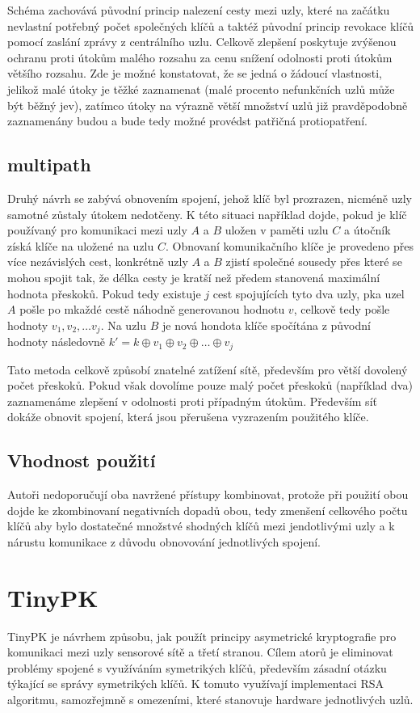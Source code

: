 \documentclass[11pt,final,twoside]{fithesis2}
\begin{document}
Schéma zachovává původní princip nalezení cesty mezi uzly, které na začátku nevlastní potřebný počet společných klíčů a taktéž původní princip revokace klíčů pomocí zaslání zprávy z 
centrálního uzlu. Celkově zlepšení poskytuje zvýšenou ochranu proti útokům malého rozsahu za cenu snížení odolnosti proti útokům většího rozsahu. Zde je možné konstatovat, že se jedná 
o žádoucí vlastnosti, jelikož malé útoky je těžké zaznamenat (malé procento nefunkčních uzlů může být běžný jev), zatímco útoky na výrazně větší množství uzlů již pravděpodobně zaznamenány budou a 
bude tedy možné provédst patřičná protiopatření. 

\subsection{multipath}
Druhý návrh se zabývá obnovením spojení, jehož klíč byl prozrazen, nicméně uzly samotné zůstaly útokem nedotčeny. K této situaci například dojde, pokud je klíč používaný pro komunikaci mezi
uzly $A$ a $B$ uložen v paměti uzlu $C$ a útočník získá klíče na uložené na uzlu $C$. Obnovaní komunikačního klíče je provedeno přes více nezávislých cest, konkrétně uzly $A$ a $B$ zjistí společné sousedy
přes které se mohou spojit tak, že délka cesty je kratší než předem stanovená maximální hodnota přeskoků. Pokud tedy existuje $j$ cest spojujících tyto dva uzly, pka uzel $A$ pošle po mkaždé cestě náhodně 
generovanou hodnotu $v$, celkově tedy pošle hodnoty $v_1, v_2, \dots v_j$. Na uzlu $B$ je nová hondota klíče spočítána z původní hodnoty následovně $k' = k \oplus v_1 \oplus v_2 \oplus \dots \oplus v_j$

Tato metoda celkově způsobí znatelné zatížení sítě, především pro větší dovolený počet přeskoků. Pokud však dovolíme pouze malý počet přeskoků (například dva) zaznamenáme zlepšení v odolnosti proti 
případným útokům. Především síť dokáže obnovit spojení, která jsou přerušena vyzrazením použitého klíče.

\subsection{Vhodnost použití}
Autoři nedoporučují oba navržené přístupy kombinovat, protože při použití obou dojde ke zkombinovaní negativních dopadů obou, tedy zmenšení celkového počtu klíčů aby bylo dostatečné množstvé shodných
klíčů mezi jendotlivými uzly a k nárustu komunikace z důvodu obnovování jednotlivých spojení.


\section{TinyPK}
TinyPK\cite{Watro2004} je návrhem způsobu, jak použít principy asymetrické kryptografie 
pro komunikaci mezi uzly sensorové sítě a třetí stranou. Cílem atorů je eliminovat problémy spojené s využíváním 
symetrikých klíčů, především zásadní otázku týkající se správy symetrikých klíčů. K tomuto využívají
implementaci RSA algoritmu\cite{Rivest1978}, samozřejmně s omezeními, které stanovuje hardware jednotlivých uzlů.
\end{document}
